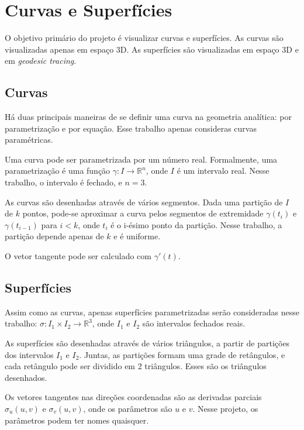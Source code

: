 \chapter{Curvas e Superfícies}
\label{geomdiff}
O objetivo primário do projeto é visualizar curvas e superfícies.
As curvas são visualizadas apenas em espaço 3D.
As superfícies são visualizadas em espaço 3D e em \textit{geodesic tracing}.

\section{Curvas}
Há duas principais maneiras de se definir uma curva na geometria analítica:
por parametrização e por equação. Esse trabalho apenas consideras curvas paramétricas.

Uma curva pode ser parametrizada por um número real.
Formalmente, uma parametrização é uma função $\gamma : I \rightarrow \mathbb{R}^n$, onde $I$ é um intervalo real.
Nesse trabalho, o intervalo é fechado, e $n=3$.

As curvas são desenhadas através de vários segmentos.
Dada uma partição de $I$ de $k$ pontos,
pode-se aproximar a curva pelos segmentos de extremidade $\gamma(t_{i})$ e $\gamma(t_{i-1})$ para $i<k$,
onde $t_i$ é o i-ésimo ponto da partição. Nesse trabalho, a partição depende apenas de $k$ e é uniforme.

O vetor tangente pode ser calculado com $\gamma'(t)$.

\section{Superfícies}
Assim como as curvas, apenas superfícies parametrizadas serão consideradas nesse trabalho:
$\sigma :  I_1 \times I_2 \rightarrow \mathbb{R}^3$, onde $I_1$ e $I_2$ são intervalos fechados reais.

As superfícies são desenhadas através de vários triângulos,
a partir de partições dos intervalos $I_1$ e $I_2$.
Juntas, as partições formam uma grade de retângulos, e cada retângulo pode ser dividido em 2 triângulos.
Esses são os triângulos desenhados.

Os vetores tangentes nas direções coordenadas são as derivadas parciais $\sigma_u(u,v)$ e $\sigma_v(u,v)$, onde os parâmetros são $u$ e $v$.
Nesse projeto, os parâmetros podem ter nomes quaisquer.

